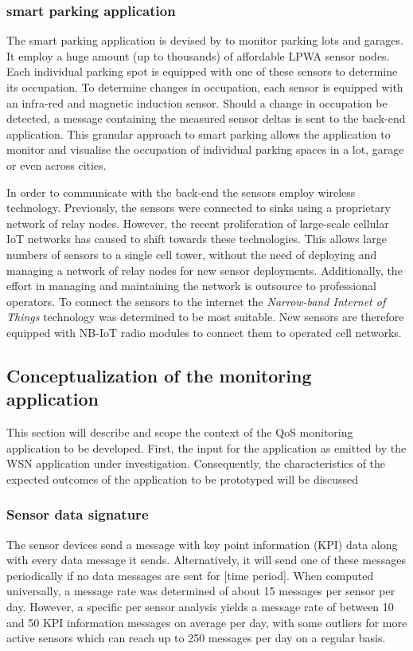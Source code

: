 \subsubsection*{\sensit smart parking application}
The \sensit\cite{web:sensit} smart parking application is devised by \nedapidsystems to monitor parking lots and garages. It employ a huge amount (up to thousands) of affordable LPWA sensor nodes. Each individual parking spot is equipped with one of these sensors to determine its occupation. To determine changes in occupation, each sensor is equipped with an infra-red and magnetic induction sensor. Should a change in occupation be detected, a message containing the measured sensor deltas is sent to the back-end application. This granular approach to smart parking allows the \sensit application to monitor and visualise the occupation of individual parking spaces in a lot, garage or even across cities.

In order to communicate with the back-end the sensors employ wireless technology. Previously, the sensors were connected to sinks using a proprietary network of relay nodes. However, the recent proliferation of large-scale cellular IoT networks has caused \nedap to shift towards these technologies. This allows large numbers of sensors to a single cell tower, without the need of deploying and managing a network of relay nodes for new sensor deployments. Additionally, the effort in managing and maintaining the network is outsource to professional operators. To connect the sensors to the internet the \emph{Narrow-band Internet of Things} technology was determined to be most suitable. New \sensit sensors are therefore equipped with \ublox\cite{web:ublox} NB-IoT radio modules to connect them to operated cell networks.

\subsection{Conceptualization of the monitoring application}
This section will describe and scope the context of the QoS monitoring application to be developed. First, the input for the application as  emitted by the WSN application under investigation. Consequently, the characteristics of the expected outcomes of the application to be prototyped will be discussed

\subsubsection{Sensor data signature}
The sensor devices send a message with key point information (KPI) data along with every data message it sends. Alternatively, it will send one of these messages periodically if no data messages are sent for [time period]. When computed universally, a message rate was determined of about 15 messages per sensor per day. However, a specific per sensor analysis yields a message rate of between 10 and 50 KPI information messages on average per day, with some outliers for more active sensors which can reach up to 250 messages per day on a regular basis.


